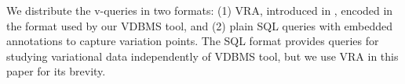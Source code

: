 We distribute the v-queries in two formats: (1) VRA, introduced in , 
encoded in the format used by
our VDBMS tool, and (2) plain SQL queries with embedded 
annotations to capture variation points.
%
The SQL format provides queries for studying variational data 
independently of VDBMS tool,
but we use VRA in
this paper for its brevity.



%
